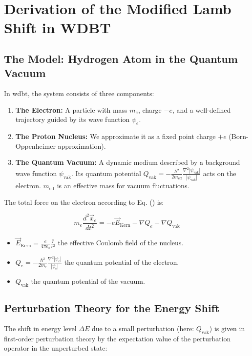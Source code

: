 \chapter{Derivation of the Modified Lamb Shift in WDBT}
\label{att:lamb_shift}

\section{The Model: Hydrogen Atom in the Quantum Vacuum}
In \gls{wdbt}, the system consists of three components:

\begin{enumerate}
    \item \textbf{The Electron:} A particle with mass $m_e$, charge $-e$, and a well-defined trajectory guided by its wave function $\psi_e$.
    \item \textbf{The Proton Nucleus:} We approximate it as a fixed point charge $+e$ (Born-Oppenheimer approximation).
    \item \textbf{The Quantum Vacuum:} A dynamic medium described by a background wave function $\psi_\text{vak}$. Its quantum potential $Q_{\text{vak}} = -\frac{\hbar^2}{2m_{\text{eff}}} \frac{\nabla^2 \left|{\psi_{\text{vak}}}\right|}{\left|{\psi_{\text{vak}}}\right|}$ acts on the electron. $m_\text{eff}$ is an effective mass for vacuum fluctuations.
\end{enumerate}

The total force on the electron according to Eq. () is:

\begin{equation}
    \label{eq:wdbt_lamb_kraft}
    m_e \frac{d^2\vec{x}_e}{dt^2} = -e\vec{E}_{\text{Kern}} - \nabla Q_e - \nabla Q_{\text{vak}}
\end{equation}

\begin{itemize}
    \item $\vec{E}_{\text{Kern}} = \frac{e}{4\pi\epsilon_0} \frac{\hat{r}}{r^2}$ the effective Coulomb field of the nucleus.
    \item $Q_e = -\frac{\hbar^2}{2m_e} \frac{\nabla^2 |\psi_e|}{|\psi_e|}$ the quantum potential of the electron.
    \item $Q_\text{vak}$ the quantum potential of the vacuum.
\end{itemize}

\section{Perturbation Theory for the Energy Shift}
The shift in energy level $\Delta E$ due to a small perturbation (here: $Q_\text{vak}$) is given in first-order perturbation theory by the expectation value of the perturbation operator in the unperturbed state:

